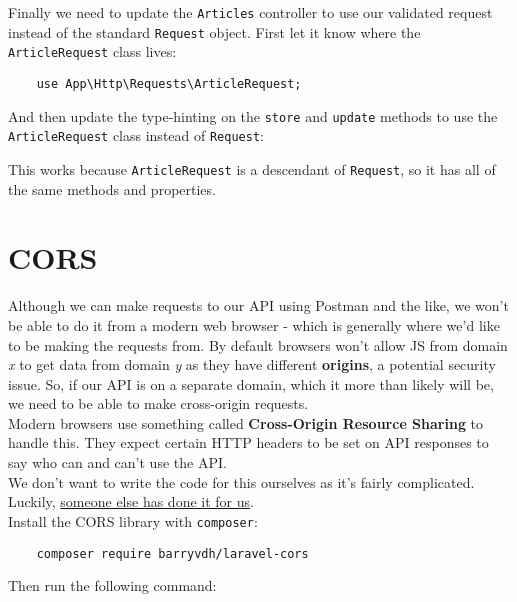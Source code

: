 

Finally we need to  update the \texttt{Articles} controller to use our validated request instead of the standard \texttt{Request} object. First let it know where the \texttt{ArticleRequest} class lives:

\begin{verbatim}
    use App\Http\Requests\ArticleRequest;
\end{verbatim}

And then update the type-hinting on the \texttt{store} and \texttt{update} methods to use the \texttt{ArticleRequest} class instead of \texttt{Request}:


This works because \texttt{ArticleRequest} is a descendant of \texttt{Request}, so it has all of the same methods and properties.


\section{CORS}

Although we can make requests to our API using Postman and the like, we won't be able to do it from a modern web browser - which is generally where we'd like to be making the requests from. By default browsers won't allow JS from domain \textit{x} to get data from domain \textit{y} as they have different \textbf{origins}, a potential security issue. So, if our API is on a separate domain, which it more than likely will be, we need to be able to make cross-origin requests.
\\

Modern browsers use something called \textbf{Cross-Origin Resource Sharing} to handle this. They expect certain HTTP headers to be set on API responses to say who can and can't use the API.
\\

We don't want to write the code for this ourselves as it's fairly complicated. Luckily, \href{https://github.com/barryvdh/laravel-cors}{someone else has done it for us}.
\\

Install the CORS library with \texttt{composer}:

\begin{verbatim}
    composer require barryvdh/laravel-cors
\end{verbatim}

Then run the following command:

